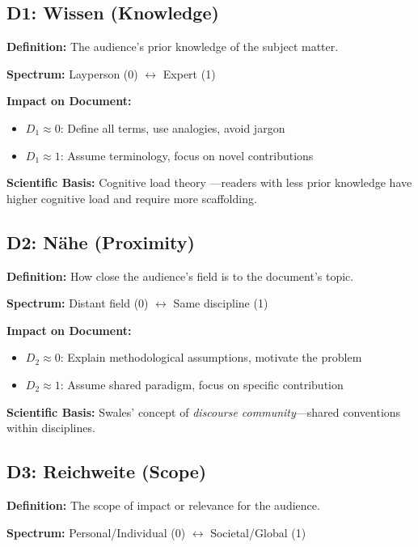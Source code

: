 \subsection{D1: Wissen (Knowledge)}

\textbf{Definition:} The audience's prior knowledge of the subject matter.

\textbf{Spectrum:} Layperson (0) $\leftrightarrow$ Expert (1)

\textbf{Impact on Document:}
\begin{itemize}[nosep]
\item $D_1 \approx 0$: Define all terms, use analogies, avoid jargon
\item $D_1 \approx 1$: Assume terminology, focus on novel contributions
\end{itemize}

\textbf{Scientific Basis:} Cognitive load theory \citep{sweller1988}---readers
with less prior knowledge have higher cognitive load and require more scaffolding.

\subsection{D2: N\"ahe (Proximity)}

\textbf{Definition:} How close the audience's field is to the document's topic.

\textbf{Spectrum:} Distant field (0) $\leftrightarrow$ Same discipline (1)

\textbf{Impact on Document:}
\begin{itemize}[nosep]
\item $D_2 \approx 0$: Explain methodological assumptions, motivate the problem
\item $D_2 \approx 1$: Assume shared paradigm, focus on specific contribution
\end{itemize}

\textbf{Scientific Basis:} Swales' \citeyearpar{swales1990} concept of
\textit{discourse community}---shared conventions within disciplines.

\subsection{D3: Reichweite (Scope)}

\textbf{Definition:} The scope of impact or relevance for the audience.

\textbf{Spectrum:} Personal/Individual (0) $\leftrightarrow$ Societal/Global (1)

